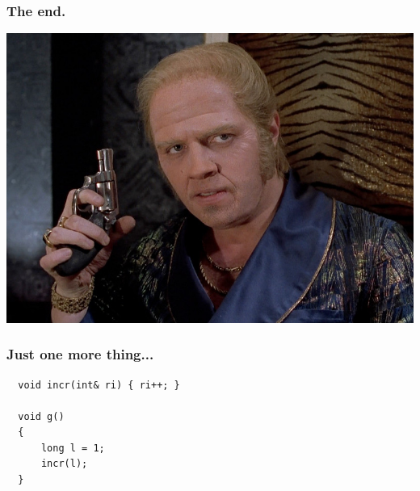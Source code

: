 \documentclass[aspectratio=43]{beamer}
\begin{document}
\begin{frame}[fragile]
  \frametitle{The end.}

  \pause
  \begin{center}
  \includegraphics[height=.85\textheight]{resources/biff.jpg}
  \end{center}
\end{frame}


\begin{frame}[fragile]
  \frametitle{Just one more thing...}
  
  \begin{lstlisting}
  void incr(int& ri) { ri++; }

  void g()
  {
      long l = 1;
      incr(l);
  }
  \end{lstlisting}
\end{frame}
\end{document}
